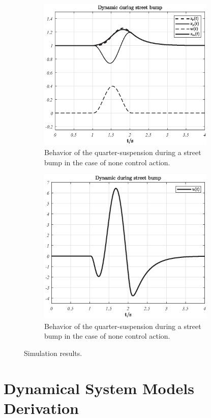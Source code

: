 \documentclass[11pt,a4paper,oneside]{book}
\numberwithin{equation}{section}
\theoremstyle{it}
\theoremstyle{definition}
\begin{document}
\begin{figure}[H]
	\centering
	\begin{subfigure}{.5\textwidth}
		\centering
		\includegraphics[width = 240pt, keepaspectratio]{figures/adaptive_control/track2.eps}
		\captionsetup{width=0.5\textwidth, font=small}		
		\caption{Behavior of the quarter-suspension during a street bump in the case of none control action.}
		\label{figSim7}
	\end{subfigure}%
	\begin{subfigure}{.5\textwidth}
		\centering
		\includegraphics[width = 240pt, keepaspectratio]{figures/adaptive_control/track3.eps}
		\captionsetup{width=0.5\textwidth, font=small}		
		\caption{Behavior of the quarter-suspension during a street bump in the case of none control action.}
		\label{figSim8}
	\end{subfigure}
	\caption{Simulation results.}
	\label{}
\end{figure}

\chapter{Dynamical System Models Derivation}\label{DynamicalSystemModelsDerivation}
\end{document}
